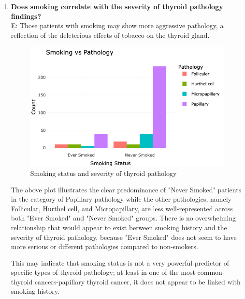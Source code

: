 \documentclass[12pt]{article}
\begin{document}
\begin{enumerate}
    \item \textbf{Does smoking correlate with the severity of thyroid pathology findings?} \\ [4pt]
    E: Those patients with smoking may show more aggressive pathology, a reflection of the deleterious effects of tobacco on the thyroid gland.

 \begin{figure}[h]
        \vspace{5pt}
        \centering
        \includegraphics[width=1.1\textwidth]{smoking vs pathology.png}  
        \caption{Smoking status and severity of thyroid pathology}
            \label{fig:example}
       \vspace{0.5cm}
    \end{figure}

The above plot illustrates the clear predominance of "Never Smoked" patients in the category of Papillary pathology while the other pathologies, namely Follicular, Hurthel cell, and Micropapillary, are less well-represented across both "Ever Smoked" and "Never Smoked" groups. There is no overwhelming relationship that would appear to exist between smoking history and the severity of thyroid pathology, because "Ever Smoked" does not seem to have more serious or different pathologies compared to non-smokers.

\hspace{9pt} This may indicate that smoking status is not a very powerful predictor of specific types of thyroid pathology; at least in one of the most common-thyroid cancers-papillary thyroid cancer, it does not appear to be linked with smoking history.

\newpage


\end{enumerate}
\end{document}
